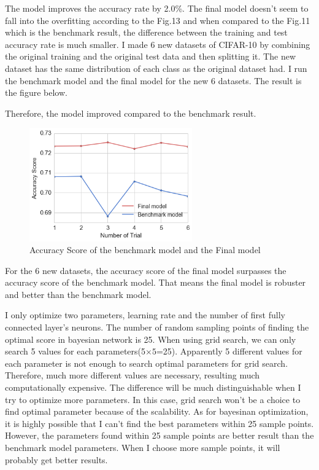 
The model improves the accuracy rate by 2.0\%. The final model doesn't seem to fall into the overfitting according to the Fig.13 and when compared to the Fig.11 which is the benchmark result, the difference between the training and test accuracy rate is much smaller. I made 6 new datasets of CIFAR-10 by combining the original training and the original test data and then splitting it. The new dataset has the same distribution of each class as the original dataset had. I run the benchmark model and the final model for the new 6 datasets. The result is the figure below. 

 Therefore, the model improved compared to the benchmark result.
 
 \begin{figure}[H]

	\begin{center}
	\includegraphics[width=7cm]{picture/Validation.png}
	\caption{Accuracy Score of the benchmark model and the Final model}
	\end{center}
	\label{fig:14}

\end{figure}

For the 6 new datasets, the accuracy score of the final model surpasses the accuracy score of the benchmark model. That means the final model is robuster and better than the benchmark model.

I only optimize two parameters, learning rate and the number of first fully connected layer's neurons. The number of random sampling points of finding the optimal score in bayesian network is 25.  When using grid search, we can only search 5 values for each parameters(5$\times5$=25). Apparently 5 different values for each parameter is not enough to search optimal parameters for grid search. Therefore, much more different values are necessary, resulting much computationally expensive. The difference will be much distinguishable when I try to optimize more parameters. In this case, grid search won't be a choice to find optimal parameter because of the scalability.  As for bayesinan optimization, it is highly possible that I can't find the best parameters within 25 sample points. However, the parameters found within 25 sample points are better result than the benchmark model parameters. When I choose more sample points, it will probably get better results. 


